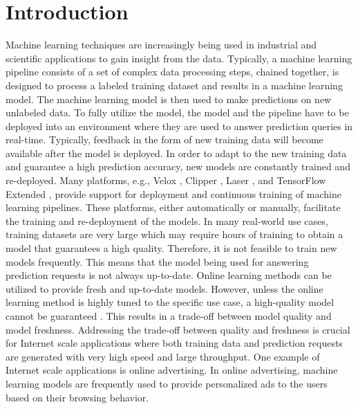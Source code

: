 \section{Introduction} \label{introduction}
Machine learning techniques are increasingly being used in industrial and scientific applications to gain insight from the data.
Typically, a machine learning pipeline consists of a set of complex data processing steps, chained together, is designed to process a labeled training dataset and results in a machine learning model.
The machine learning model is then used to make predictions on new unlabeled data.
To fully utilize the model,  the model and the pipeline have to be deployed into an environment where they are used to answer prediction queries in real-time.
Typically, feedback in the form of new training data will become available after the model is deployed.
In order to adapt to the new training data and guarantee a high prediction accuracy, new models are constantly trained and re-deployed.
Many platforms, e.g., Velox \cite{crankshaw2014missing}, Clipper \cite{crankshaw2016clipper}, Laser \cite{agarwal2014laser}, and TensorFlow Extended \cite{baylor2017tfx}, provide support for deployment and continuous training of machine learning pipelines. 
These platforms, either automatically or manually, facilitate the training and re-deployment of the models.
In many real-world use cases, training datasets are very large which may require hours of training to obtain a model that guarantees a high quality.
Therefore, it is not feasible to train new models frequently.
This means that the model being used for answering prediction requests is not always up-to-date.
Online learning methods can be utilized to provide fresh and up-to-date models.
However, unless the online learning method is highly tuned to the specific use case, a high-quality model cannot be guaranteed \cite{ma2009identifying}. 
This results in a trade-off between model quality and model freshness.
Addressing the trade-off between quality and freshness is crucial for Internet scale applications where both training data and prediction requests are generated with very high speed and large throughput.
One example of Internet scale applications is online advertising.
In online advertising, machine learning models are frequently used to provide personalized ads to the users based on their browsing behavior.
